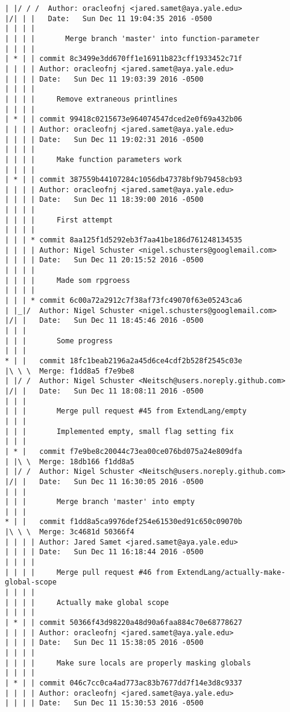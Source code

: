 \begin{lstlisting}
| |/ / /  Author: oracleofnj <jared.samet@aya.yale.edu>
|/| | |   Date:   Sun Dec 11 19:04:35 2016 -0500
| | | |   
| | | |       Merge branch 'master' into function-parameter
| | | |     
| * | | commit 8c3499e3dd670ff1e16911b823cff1933452c71f
| | | | Author: oracleofnj <jared.samet@aya.yale.edu>
| | | | Date:   Sun Dec 11 19:03:39 2016 -0500
| | | | 
| | | |     Remove extraneous printlines
| | | |     
| * | | commit 99418c0215673e964074547dced2e0f69a432b06
| | | | Author: oracleofnj <jared.samet@aya.yale.edu>
| | | | Date:   Sun Dec 11 19:02:31 2016 -0500
| | | | 
| | | |     Make function parameters work
| | | |     
| * | | commit 387559b44107284c1056db47378bf9b79458cb93
| | | | Author: oracleofnj <jared.samet@aya.yale.edu>
| | | | Date:   Sun Dec 11 18:39:00 2016 -0500
| | | | 
| | | |     First attempt
| | | |     
| | | * commit 8aa125f1d5292eb3f7aa41be186d761248134535
| | | | Author: Nigel Schuster <nigel.schusters@googlemail.com>
| | | | Date:   Sun Dec 11 20:15:52 2016 -0500
| | | | 
| | | |     Made som rpgroess
| | | |     
| | | * commit 6c00a72a2912c7f38af73fc49070f63e05243ca6
| |_|/  Author: Nigel Schuster <nigel.schusters@googlemail.com>
|/| |   Date:   Sun Dec 11 18:45:46 2016 -0500
| | |   
| | |       Some progress
| | |      
* | |   commit 18fc1beab2196a2a45d6ce4cdf2b528f2545c03e
|\ \ \  Merge: f1dd8a5 f7e9be8
| |/ /  Author: Nigel Schuster <Neitsch@users.noreply.github.com>
|/| |   Date:   Sun Dec 11 18:08:11 2016 -0500
| | |   
| | |       Merge pull request #45 from ExtendLang/empty
| | |       
| | |       Implemented empty, small flag setting fix
| | |      
| * |   commit f7e9be8c20044c73ea00ce076bd075a24e809dfa
| |\ \  Merge: 18db166 f1dd8a5
| |/ /  Author: Nigel Schuster <Neitsch@users.noreply.github.com>
|/| |   Date:   Sun Dec 11 16:30:05 2016 -0500
| | |   
| | |       Merge branch 'master' into empty
| | |      
* | |   commit f1dd8a5ca9976def254e61530ed91c650c09070b
|\ \ \  Merge: 3c4681d 50366f4
| | | | Author: Jared Samet <jared.samet@aya.yale.edu>
| | | | Date:   Sun Dec 11 16:18:44 2016 -0500
| | | | 
| | | |     Merge pull request #46 from ExtendLang/actually-make-global-scope
| | | |     
| | | |     Actually make global scope
| | | |     
| * | | commit 50366f43d98220a48d90a6faa884c70e68778627
| | | | Author: oracleofnj <jared.samet@aya.yale.edu>
| | | | Date:   Sun Dec 11 15:38:05 2016 -0500
| | | | 
| | | |     Make sure locals are properly masking globals
| | | |     
| * | | commit 046c7cc0ca4ad773ac83b7677dd7f14e3d8c9337
| | | | Author: oracleofnj <jared.samet@aya.yale.edu>
| | | | Date:   Sun Dec 11 15:30:53 2016 -0500

\end{lstlisting}
